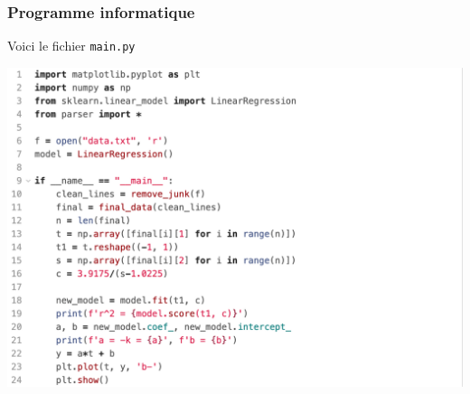 \documentclass[14pt]{article}
\begin{document}
  \subsubsection*{Programme informatique}

  Voici le fichier \texttt{main.py}
	\begin{center}
		\includegraphics[scale=0.5]{./01.png}
	\end{center}
\end{document}
